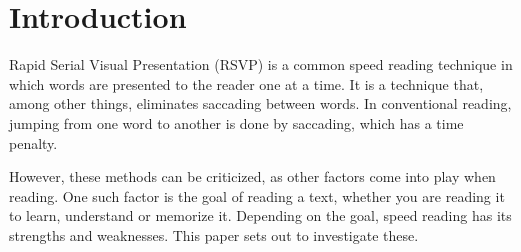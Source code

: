 \section{Introduction}
Rapid Serial Visual Presentation (RSVP) is a common speed reading technique in which words are presented to the reader one at a time. It is a technique that, among other things, eliminates saccading between words. In conventional reading, jumping from one word to another is done by saccading, which has a time penalty.

However, these methods can be criticized, as other factors come into play when reading. One such factor is the goal of reading a text, whether you are reading it to learn, understand or memorize it. Depending on the goal, speed reading has its strengths and weaknesses. This paper sets out to investigate these.

